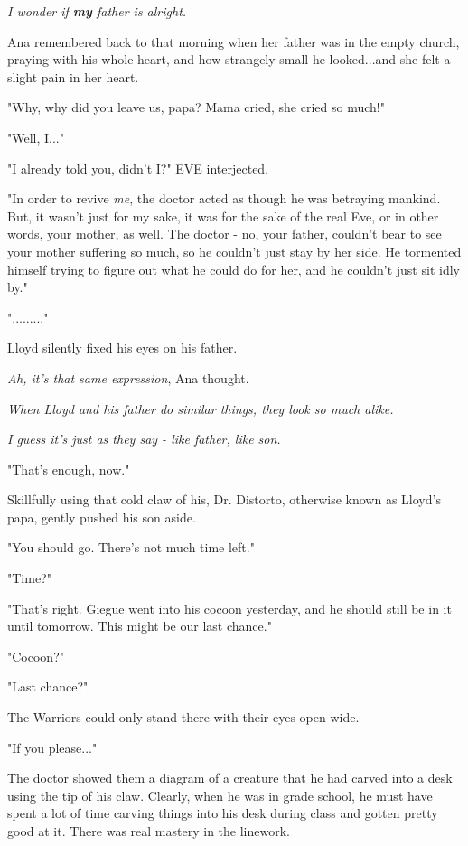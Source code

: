 \documentclass[
]{article}
\begin{document}
\emph{I wonder if \textbf{my} father is alright.}

Ana remembered back to that morning when her father was in the empty
church, praying with his whole heart, and how strangely small he
looked...and she felt a slight pain in her heart.

"Why, why did you leave us, papa? Mama cried, she cried so much!"

"Well, I..."

"I already told you, didn't I?" EVE interjected.

"In order to revive \emph{me}, the doctor acted as though he was
betraying mankind. But, it wasn't just for my sake, it was for the sake
of the real Eve, or in other words, your mother, as well. The doctor -
no, your father, couldn't bear to see your mother suffering so much, so
he couldn't just stay by her side. He tormented himself trying to figure
out what he could do for her, and he couldn't just sit idly by."

"........."

Lloyd silently fixed his eyes on his father.

\emph{Ah, it's that same expression}, Ana thought.

\emph{When Lloyd and his father do similar things, they look so much
alike.}

\emph{I guess it's just as they say - like father, like son.}

"That's enough, now."

Skillfully using that cold claw of his, Dr. Distorto, otherwise known as
Lloyd's papa, gently pushed his son aside.

"You should go. There's not much time left."

"Time?"

"That's right. Giegue went into his cocoon yesterday, and he should
still be in it until tomorrow. This might be our last chance."

"Cocoon?"

"Last chance?"

The Warriors could only stand there with their eyes open wide.

"If you please..."

The doctor showed them a diagram of a creature that he had carved into a
desk using the tip of his claw. Clearly, when he was in grade school, he
must have spent a lot of time carving things into his desk during class
and gotten pretty good at it. There was real mastery in the linework.
\end{document}

